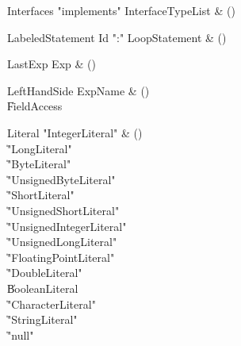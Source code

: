 \begin{bbgrammar}

Interfaces \label{prod:Interfaces}  \: \xcd"implements" InterfaceTypeList & () \\


\end{bbgrammar}

\begin{bbgrammar}

LabeledStatement \label{prod:LabeledStatement}  \: Id \xcd":" LoopStatement & () \\


\end{bbgrammar}

\begin{bbgrammar}

LastExp \label{prod:LastExp}  \: Exp & () \\


\end{bbgrammar}

\begin{bbgrammar}

LeftHandSide \label{prod:LeftHandSide}  \: ExpName & () \\

    \| FieldAccess \\

\end{bbgrammar}

\begin{bbgrammar}

Literal \label{prod:Literal}  \: \xcd"IntegerLiteral"  & () \\

    \| \xcd"LongLiteral"  \\
    \| \xcd"ByteLiteral" \\
    \| \xcd"UnsignedByteLiteral" \\
    \| \xcd"ShortLiteral" \\
    \| \xcd"UnsignedShortLiteral" \\
    \| \xcd"UnsignedIntegerLiteral"  \\
    \| \xcd"UnsignedLongLiteral"  \\
    \| \xcd"FloatingPointLiteral"  \\
    \| \xcd"DoubleLiteral"  \\
    \| BooleanLiteral \\
    \| \xcd"CharacterLiteral"  \\
    \| \xcd"StringLiteral"  \\
    \| \xcd"null" \\

\end{bbgrammar}

